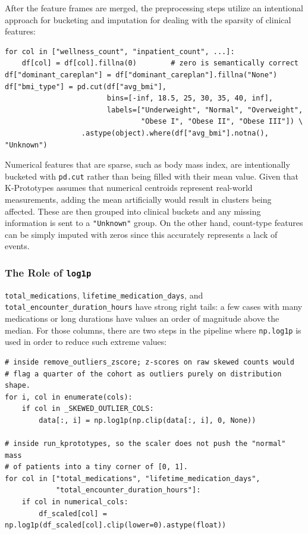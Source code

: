 After the feature frames are merged, the preprocessing steps utilize an intentional approach for bucketing and imputation for dealing with the sparsity of clinical features:

\begin{lstlisting}[style=pythonstyle]
for col in ["wellness_count", "inpatient_count", ...]:
    df[col] = df[col].fillna(0)        # zero is semantically correct
df["dominant_careplan"] = df["dominant_careplan"].fillna("None")
df["bmi_type"] = pd.cut(df["avg_bmi"],
                        bins=[-inf, 18.5, 25, 30, 35, 40, inf],
                        labels=["Underweight", "Normal", "Overweight",
                                "Obese I", "Obese II", "Obese III"]) \
                  .astype(object).where(df["avg_bmi"].notna(), "Unknown")
\end{lstlisting}

\noindent Numerical features that are sparse, such as body mass index, are intentionally bucketed with \texttt{pd.cut} rather than being filled with their mean value. Given that K-Prototypes assumes that numerical centroids represent real-world measurements, adding the mean artificially would result in clusters being affected. These are then grouped into clinical buckets and any missing information is sent to a \texttt{"Unknown"} group. On the other hand, count-type features can be simply imputed with zeros since this accurately represents a lack of events.

\subsubsection*{The Role of \texttt{log1p}}

\texttt{total\_\allowbreak medications}, \texttt{lifetime\_\allowbreak medication\_\allowbreak days}, and \texttt{total\_\allowbreak encounter\_\allowbreak duration\_\allowbreak hours} have strong right tails: a few cases with many medications or long durations have values an order of magnitude above the median. For those columns, there are two steps in the pipeline where \texttt{np.log1p} is used in order to reduce such extreme values:

\begin{lstlisting}[style=pythonstyle]
# inside remove_outliers_zscore; z-scores on raw skewed counts would
# flag a quarter of the cohort as outliers purely on distribution shape.
for i, col in enumerate(cols):
    if col in _SKEWED_OUTLIER_COLS:
        data[:, i] = np.log1p(np.clip(data[:, i], 0, None))

# inside run_kprototypes, so the scaler does not push the "normal" mass
# of patients into a tiny corner of [0, 1].
for col in ["total_medications", "lifetime_medication_days",
            "total_encounter_duration_hours"]:
    if col in numerical_cols:
        df_scaled[col] = np.log1p(df_scaled[col].clip(lower=0).astype(float))
\end{lstlisting}

